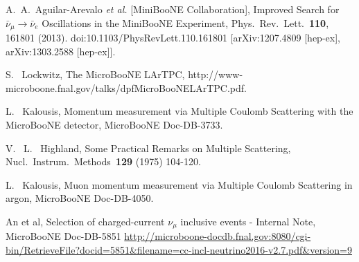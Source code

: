 \begin{thebibliography}{1}
 
  


  
  A.~A.~Aguilar-Arevalo {\it et al.} 
  [MiniBooNE Collaboration],
  Improved Search for $\bar \nu_\mu \rightarrow \bar \nu_e$ Oscillations in the MiniBooNE Experiment,
  Phys.\ Rev.\ Lett.\  {\bf 110}, 161801 (2013).
  doi:10.1103/PhysRevLett.110.161801
  [arXiv:1207.4809 [hep-ex], arXiv:1303.2588 [hep-ex]].
  
  S. ~Lockwitz, 
  The MicroBooNE LArTPC,
  http://www-microboone.fnal.gov/talks/dpfMicroBooNELArTPC.pdf.
  
  L. ~Kalousis, 
  Momentum measurement via Multiple Coulomb
Scattering with the MicroBooNE detector, 
  MicroBooNE Doc-DB-3733.
  
  V. ~L. ~Highland, 
  Some Practical Remarks on Multiple Scattering, 
  Nucl.\ Instrum.\ Methods\ {\bf 129} (1975)
104-120.
  
  L. ~Kalousis, 
  Muon momentum measurement via Multiple Coulomb Scattering in argon,
  MicroBooNE Doc-DB-4050.

An et al,
Selection of charged-current $\nu_\mu$ inclusive events - Internal Note,
MicroBooNE Doc-DB-5851
\url{http://microboone-docdb.fnal.gov:8080/cgi-bin/RetrieveFile?docid=5851&filename=cc-incl-neutrino2016-v2.7.pdf&version=9}

\end{thebibliography}